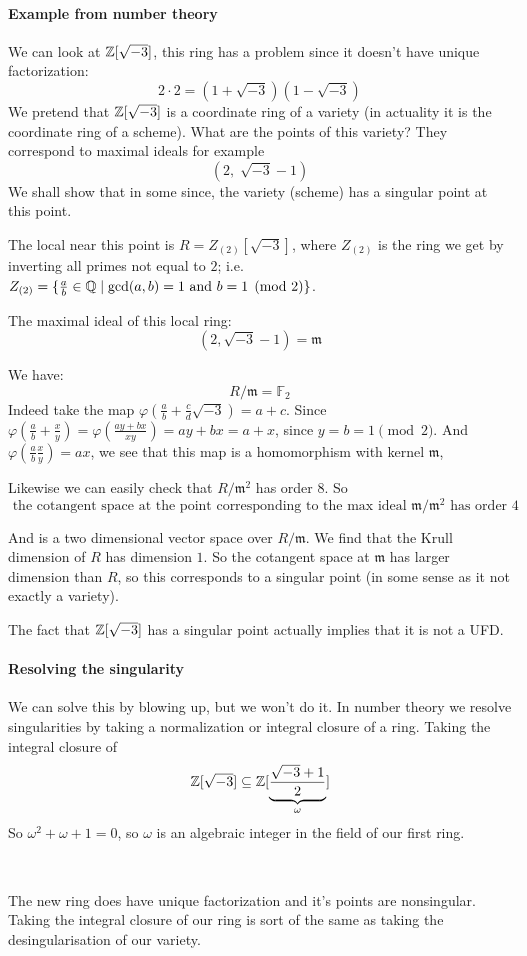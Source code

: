 \paragraph*{Example from number theory}
\begin{example}
    We can look at $\mathbb{Z}[\sqrt{-3}]$, this ring has a problem since it doesn't have unique factorization:\[2\cdot 2 = (1+\sqrt{-3})(1-\sqrt{-3})\]
    We pretend that $\mathbb{Z}[\sqrt{-3}]$ is a coordinate ring of a variety (in actuality it is the coordinate ring of a scheme). What are the points of this variety? They correspond to maximal ideals for example\begin{equation*}
        (2,\sqrt[]{-3}- 1)
    \end{equation*}
    We shall show that in some since, the variety (scheme) has a singular point at this point.

    The local near this point is $R = Z_{(2)}[\sqrt{-3}]$, where $Z_{(2)}$ is the ring we get by inverting all primes not equal to $2$; i.e. $Z_{(2)} = \{\frac{a}{b}\in \mathbb{Q} \mid \gcd(a,b) = 1\text{ and }b=1\pmod 2 \}$. 
    
    The maximal ideal of this local ring:\[(2,\sqrt{-3}-1) = \mathfrak{m}\]
    
    We have:\[R/\mathfrak{m} = \mathbb{F}_2\] Indeed take the map $\varphi(\frac{a}{b}+\frac{c}{d}\sqrt{-3}) = a+c$. Since $\varphi(\frac{a}{b}+\frac{x}{y}) = \varphi(\frac{ay+bx}{xy}) = ay+bx=a+x$, since $y=b=1\pmod 2$. And $\varphi(\frac{a}{b}\frac{x}{y}) = ax$, we see that this map is a homomorphism with kernel $\mathfrak{m}$,

    Likewise we can easily check that $R/\mathfrak{m}^2$ has order $8$. So \[\text{ the cotangent space at the point corresponding to the max ideal }\mathfrak{m}/\mathfrak{m}^2 \text{ has order }4\]

    And is a two dimensional vector space over $R/\mathfrak{m}$. We find that the Krull dimension of $R$ has dimension $1$. So the cotangent space at $\mathfrak{m}$ has larger dimension than $R$, so this corresponds to a singular point (in some sense as it not exactly a variety).

    The fact that $\mathbb{Z}[\sqrt{-3}]$ has a singular point actually implies that it is not a UFD.

    \paragraph*{Resolving the singularity}
    We can solve this by blowing up, but we won't do it. In number theory we resolve singularities by taking a normalization or integral closure of a ring. Taking the integral closure of \[\mathbb{Z}[\sqrt{-3}]\subseteq \mathbb{Z}[\underbrace{\frac{\sqrt{-3}+1}{2}}_\omega]\]
    So $\omega^2+\omega+1=0$, so $\omega$ is an algebraic integer in the field of our first ring.

    \

    The new ring does have unique factorization and it's points are nonsingular. Taking the integral closure of our ring is sort of the same as taking the desingularisation of our variety.
\end{example}
